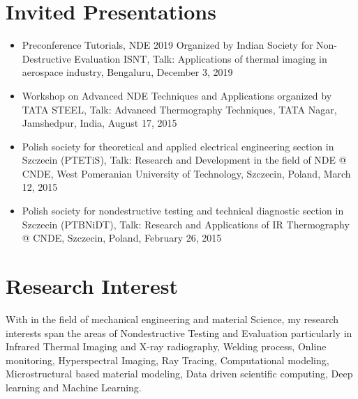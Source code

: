 \documentclass{my_cv}%
\begin{document}
\section{Invited Presentations}
\vspace{1em}
\begin{itemize}[leftmargin=0.15in]
\setlength\itemsep{-0.1em}
\color{mygray}
\item Preconference Tutorials, NDE 2019 Organized by Indian Society for Non-Destructive Evaluation ISNT, Talk: Applications of thermal imaging in aerospace industry, Bengaluru, December 3, 2019
\item Workshop on Advanced NDE Techniques and Applications organized by TATA STEEL, Talk: Advanced Thermography Techniques, TATA Nagar, Jamshedpur, India, August 17, 2015
\item Polish society for theoretical and applied electrical engineering section in Szczecin (PTETiS), Talk: Research and Development in the field of NDE @ CNDE, West Pomeranian University of Technology, Szczecin, Poland, March 12, 2015
\item Polish society for nondestructive testing and technical diagnostic section in Szczecin (PTBNiDT), Talk: Research and Applications of IR Thermography @ CNDE, Szczecin, Poland, February 26, 2015
\end{itemize}
\section{Research Interest}
\vspace{1em}
\begin{normalsize}\color{mygray}With in the field of mechanical engineering and material Science, my research interests span the areas of Nondestructive Testing and Evaluation particularly in Infrared Thermal Imaging and X-ray radiography, Welding process, Online monitoring, Hyperspectral Imaging, Ray Tracing, Computational modeling, Microstructural based material modeling, Data driven scientific computing, Deep learning and Machine Learning.
\end{normalsize}
\end{document}
